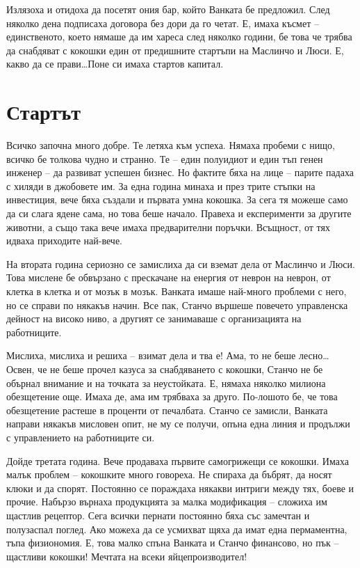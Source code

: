 \documentclass[ebook,openany,12pt]{memoir}
\begin{document}
Излязоха и отидоха да посетят ония бар, който Ванката бе предложил. След няколко дена подписаха договора без дори да го четат. Е, имаха късмет – единственото, което нямаше да им хареса след няколко години, бе това че трябва да снабдяват с кокошки един от предишните стартъпи на Маслинчо и Люси. Е, какво да се прави\ldots Поне си имаха стартов капитал.

\chapter{Стартът}

Всичко започна много добре. Те летяха към успеха. Нямаха пробеми с нищо, всичко бе толкова чудно и странно. Те – един полуидиот и един тъп генен инженер – да развиват успешен бизнес. Но фактите бяха на лице – парите падаха с хиляди в джобовете им. За една година минаха и през трите стъпки на инвестиция, вече бяха създали и първата умна кокошка. За сега тя можеше само да си слага ядене сама, но това беше начало. Правеха и експерименти за другите животни, а също така вече имаха предварителни поръчки. Всъщност, от тях идваха приходите най-вече.

На втората година сериозно се замислиха да си вземат дела от Маслинчо и Люси. Това мислене бе обвързано с прескачане на енергия от неврон на неврон, от клетка в клетка и от мозък в мозък. Ванката имаше най-много проблеми с него, но се справи по някакъв начин. Все пак, Станчо вършеше повечето управленска дейност на високо ниво, а другият се занимаваше с организацията на работниците. 

Мислиха, мислиха и решиха – взимат дела и тва е! Ама, то не беше лесно\ldots Освен, че не беше прочел казуса за снабдяването с кокошки, Станчо не бе обърнал внимание и на точката за неустойката. Е, нямаха няколко милиона обезщетение още. Имаха де, ама им трябваха за друго. По-лошото бе, че това обезщетение растеше в проценти от печалбата. Станчо се замисли, Ванката направи някакъв мисловен опит, не му се получи, опъна една линия и продължи с управлението на работниците си.

Дойде третата година. Вече продаваха първите самогрижещи се кокошки. Имаха малък проблем – кокошките много говореха. Не спираха да бъбрят, да носят клюки и да спорят. Постоянно се пораждаха някакви интриги между тях, боеве и прочие. Набързо върнаха продукцията за малка модификация – сложиха им щастлив рецептор. Сега всички пернати постоянно бяха със замечтан и полузаспал поглед. Ако можеха да се усмихват щяха да имат една пермаментна, тъпа физиономия. Е, това малко спъна Ванката и Станчо финансово, но пък – щастливи кокошки! Мечтата на всеки яйцепроизводител!
\end{document}
